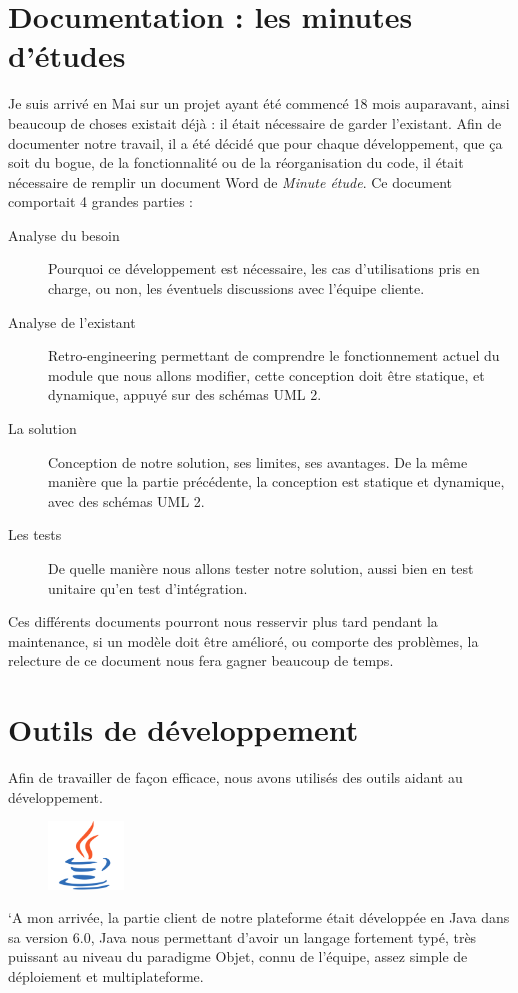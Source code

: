\section{Documentation : les minutes d'études}
Je suis arrivé en Mai sur un projet ayant été commencé 18 mois auparavant, ainsi beaucoup de choses existait déjà : il était nécessaire de
garder l'existant. Afin de documenter notre travail, il a été décidé que pour chaque développement, que ça soit du bogue, de la fonctionnalité ou de la réorganisation du code, il était nécessaire de remplir un document Word de \textit{Minute étude}. Ce document comportait 4 grandes parties : 
\begin{description}
	\item[Analyse du besoin] Pourquoi ce développement est nécessaire, les cas d'utilisations pris en charge, ou non, les éventuels discussions avec l'équipe cliente.
	\item[Analyse de l'existant] Retro-engineering permettant de comprendre le fonctionnement actuel du module que nous allons modifier, cette conception doit être statique, et dynamique, appuyé sur des schémas UML 2.
	\item[La solution] Conception de notre solution, ses limites, ses avantages. De la même manière que la partie précédente, la conception est statique et dynamique, avec des schémas UML 2.
	\item[Les tests] De quelle manière nous allons tester notre solution, aussi bien en test unitaire qu'en test d'intégration.
\end{description}

Ces différents documents pourront nous resservir plus tard pendant la maintenance, si un modèle doit être amélioré, ou comporte des
problèmes, la relecture de ce document nous fera gagner beaucoup de temps.

\section{Outils de développement}
Afin de travailler de façon efficace, nous avons utilisés des outils aidant au développement.

\begin{figure}
	\includegraphics[width=2cm]{contents/images/logoJava.png}
\end{figure}
`A mon arrivée, la partie client de notre plateforme était développée en Java dans sa version 6.0, Java nous permettant d'avoir un langage fortement typé, très puissant au niveau du paradigme Objet, connu de l'équipe, assez simple de déploiement et multiplateforme. 

